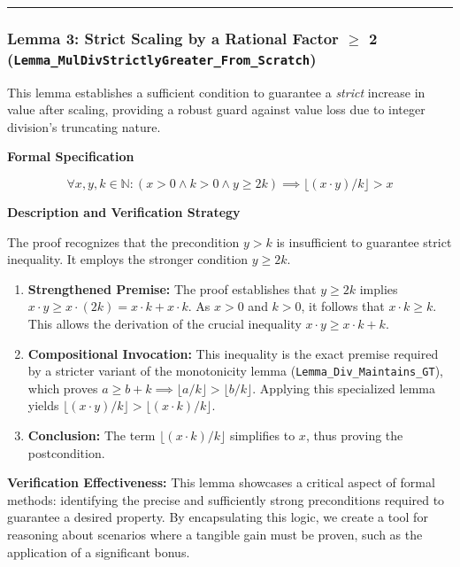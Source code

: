 \documentclass[
  english,
  onecolumn]{article}
\providecommand{\tightlist}{%
  \setlength{\itemsep}{0pt}\setlength{\parskip}{0pt}}
\begin{document}
\begin{center}\rule{0.5\linewidth}{0.5pt}\end{center}

\subsubsection{\texorpdfstring{\textbf{Lemma 3: Strict Scaling by a
Rational Factor \(\geq\) 2
(\texttt{Lemma\_MulDivStrictlyGreater\_From\_Scratch})}}{Lemma 3: Strict Scaling by a Rational Factor \textbackslash geq 2 (Lemma\_MulDivStrictlyGreater\_From\_Scratch)}}\label{lemma-3-strict-scaling-by-a-rational-factor-geq-2-lemma_muldivstrictlygreater_from_scratch}

This lemma establishes a sufficient condition to guarantee a
\emph{strict} increase in value after scaling, providing a robust guard
against value loss due to integer division's truncating nature.

\textbf{Formal Specification}

\[
\forall x, y, k \in \mathbb{N} : (x > 0 \land k > 0 \land y \ge 2k) \implies \lfloor (x \cdot y) / k \rfloor > x
\]

\textbf{Description and Verification Strategy}

The proof recognizes that the precondition \(y > k\) is insufficient to
guarantee strict inequality. It employs the stronger condition
\(y \ge 2k\).

\begin{enumerate}
\def\labelenumi{\arabic{enumi}.}
\tightlist
\item
  \textbf{Strengthened Premise:} The proof establishes that \(y \ge 2k\)
  implies \(x \cdot y \ge x \cdot (2k) = x \cdot k + x \cdot k\). As
  \(x > 0\) and \(k > 0\), it follows that \(x \cdot k \ge k\). This
  allows the derivation of the crucial inequality
  \(x \cdot y \ge x \cdot k + k\).
\item
  \textbf{Compositional Invocation:} This inequality is the exact
  premise required by a stricter variant of the monotonicity lemma
  (\texttt{Lemma\_Div\_Maintains\_GT}), which proves
  \(a \ge b+k \implies \lfloor a/k \rfloor > \lfloor b/k \rfloor\).
  Applying this specialized lemma yields
  \(\lfloor(x \cdot y)/k\rfloor > \lfloor(x \cdot k)/k\rfloor\).
\item
  \textbf{Conclusion:} The term \(\lfloor(x \cdot k)/k\rfloor\)
  simplifies to \(x\), thus proving the postcondition.
\end{enumerate}

\textbf{Verification Effectiveness:} This lemma showcases a critical
aspect of formal methods: identifying the precise and sufficiently
strong preconditions required to guarantee a desired property. By
encapsulating this logic, we create a tool for reasoning about scenarios
where a tangible gain must be proven, such as the application of a
significant bonus.
\end{document}
